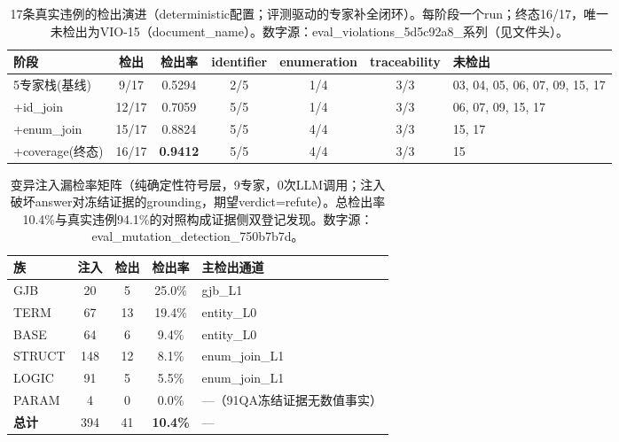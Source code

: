 \begin{table}[t]
\centering
\footnotesize
\caption{17条真实违例的检出演进（deterministic配置；评测驱动的专家补全闭环）。每阶段一个run；终态16/17，唯一未检出为VIO-15（document\_name）。数字源：eval\_violations\_5d5c92a8\_系列（见文件头）。}
\label{tab:violation}
\begin{tabular}{lccccc p{3.1cm}}
\toprule
阶段 & 检出 & 检出率 & identifier & enumeration & traceability & 未检出 \\
\midrule
5专家栈(基线) & 9/17 & 0.5294 & 2/5 & 1/4 & 3/3 & 03, 04, 05, 06, 07, 09, 15, 17 \\
+id_join & 12/17 & 0.7059 & 5/5 & 1/4 & 3/3 & 06, 07, 09, 15, 17 \\
+enum_join & 15/17 & 0.8824 & 5/5 & 4/4 & 3/3 & 15, 17 \\
+coverage(终态) & 16/17 & \textbf{0.9412} & 5/5 & 4/4 & 3/3 & 15 \\
\bottomrule
\end{tabular}
\end{table}

\begin{table}[t]
\centering
\small
\caption{变异注入漏检率矩阵（纯确定性符号层，9专家，0次LLM调用；注入破坏answer对冻结证据的grounding，期望verdict=refute）。总检出率10.4\%与真实违例94.1\%的对照构成证据侧双登记发现。数字源：eval\_mutation\_detection\_750b7b7d。}
\label{tab:mutation}
\begin{tabular}{lcccp{3.6cm}}
\toprule
族 & 注入 & 检出 & 检出率 & 主检出通道 \\
\midrule
GJB & 20 & 5 & 25.0\% & gjb_L1 \\
TERM & 67 & 13 & 19.4\% & entity_L0 \\
BASE & 64 & 6 & 9.4\% & entity_L0 \\
STRUCT & 148 & 12 & 8.1\% & enum_join_L1 \\
LOGIC & 91 & 5 & 5.5\% & enum_join_L1 \\
PARAM & 4 & 0 & 0.0\% & —（91QA冻结证据无数值事实） \\
\textbf{总计} & 394 & 41 & \textbf{10.4\%} & — \\
\bottomrule
\end{tabular}
\end{table}

